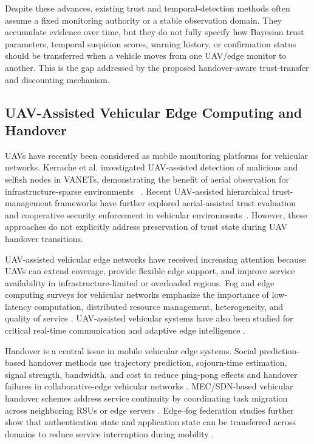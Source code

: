 \documentclass[journal]{IEEEtran}
\begin{document}
Despite these advances, existing trust and temporal-detection methods often assume a fixed monitoring authority or a stable observation domain. They accumulate evidence over time, but they do not fully specify how Bayesian trust parameters, temporal suspicion scores, warning history, or confirmation status should be transferred when a vehicle moves from one UAV/edge monitor to another. This is the gap addressed by the proposed handover-aware trust-transfer and discounting mechanism.

\subsection{UAV-Assisted Vehicular Edge Computing and Handover}
\label{subsec:rw_uav_edge_handover}

UAVs have recently been considered as mobile monitoring platforms
for vehicular networks. Kerrache et al. investigated UAV-assisted
detection of malicious and selfish nodes in VANETs, demonstrating the
benefit of aerial observation for infrastructure-sparse environments
~\cite{kerrache_uav}. Recent UAV-assisted hierarchical trust-management
frameworks have further explored aerial-assisted trust evaluation and
cooperative security enforcement in vehicular
environments~\cite{uavtrust2024}. However, these approaches do not explicitly
address preservation of trust state during UAV handover transitions.

UAV-assisted vehicular edge networks have received
increasing attention because UAVs can extend coverage, provide flexible edge
support, and improve service availability in infrastructure-limited or
overloaded regions. Fog and edge computing surveys for vehicular networks
emphasize the importance of low-latency computation, distributed resource
management, heterogeneity, and quality of service \cite{vehFogSurvey2023}.
UAV-assisted vehicular systems have also been studied for critical real-time
communication and adaptive edge intelligence \cite{hao2024UAVVehicularFRL}.

Handover is a central issue in mobile vehicular edge systems. Social prediction-based handover methods use trajectory prediction, sojourn-time estimation, signal strength, bandwidth, and cost to reduce ping-pong effects and handover failures in collaborative-edge vehicular networks \cite{qi2021SocialHandover}. MEC/SDN-based vehicular handover schemes address service continuity by coordinating task migration across neighboring RSUs or edge servers \cite{monir2022SeamlessHandover}. Edge--fog federation studies further show that authentication state and application state can be transferred across domains to reduce service interruption during mobility \cite{ali2024EdgeFogFederation}.
\end{document}
